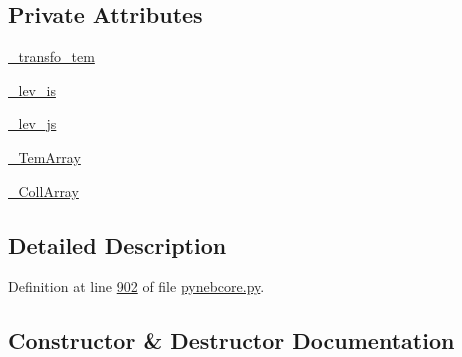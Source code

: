 \subsection*{Private Attributes}
\begin{DoxyCompactItemize}
\item 
\hyperlink{classpyneb_1_1core_1_1pynebcore_1_1___coll_data_ascii_aaf268c621d916f4ea71bb5825e249200}{\+\_\+transfo\+\_\+tem}
\item 
\hyperlink{classpyneb_1_1core_1_1pynebcore_1_1___coll_data_ascii_a87c7c234487963a3d9d015294637e59a}{\+\_\+lev\+\_\+is}
\item 
\hyperlink{classpyneb_1_1core_1_1pynebcore_1_1___coll_data_ascii_a8c077039b4837a27b71583f26dd858a8}{\+\_\+lev\+\_\+js}
\item 
\hyperlink{classpyneb_1_1core_1_1pynebcore_1_1___coll_data_ascii_adb47c4cf2b9f3b82a281d0277e136693}{\+\_\+\+Tem\+Array}
\item 
\hyperlink{classpyneb_1_1core_1_1pynebcore_1_1___coll_data_ascii_a01539063e6fade51b407dba1faa011c6}{\+\_\+\+Coll\+Array}
\end{DoxyCompactItemize}


\subsection{Detailed Description}


Definition at line \hyperlink{pynebcore_8py_source_l00902}{902} of file \hyperlink{pynebcore_8py_source}{pynebcore.\+py}.



\subsection{Constructor \& Destructor Documentation}
\hypertarget{classpyneb_1_1core_1_1pynebcore_1_1___coll_data_ascii_ad4514c646ad1e65d9d5e10c80d215041}{}
